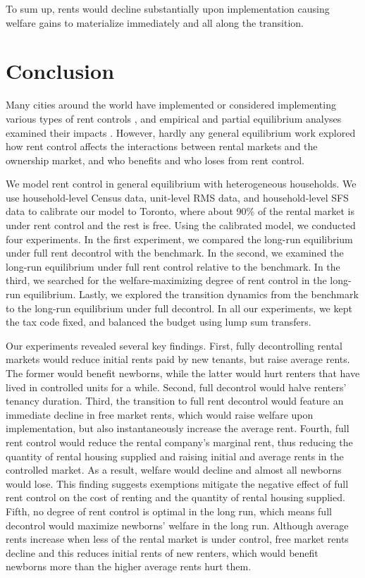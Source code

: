 \documentclass[parskip=full]{article}
\begin{document}
To sum up, rents would decline substantially upon implementation causing welfare gains to materialize immediately and all along the transition. 

\section{Conclusion}\label{sec:conclusion}

Many cities around the world have implemented or considered implementing various types of rent controls \citep{fraser-1981}, and empirical and partial equilibrium analyses examined their impacts \citep{hayek-1929,fs-1946,fallis-1985,diamond-2019}. However, hardly any general equilibrium work explored how rent control affects the interactions between rental markets and the ownership market, and who benefits and who loses from rent control. 

We model rent control in general equilibrium with heterogeneous households. We use household-level Census data, unit-level RMS data, and household-level SFS data to calibrate our model to Toronto, where about 90\% of the rental market is under rent control and the rest is free. Using the calibrated model, we conducted four experiments. In the first experiment, we compared the long-run equilibrium under full rent decontrol with the benchmark. In the second, we examined the long-run equilibrium under full rent control relative to the benchmark. In the third, we searched for the welfare-maximizing degree of rent control in the long-run equilibrium. Lastly, we explored the transition dynamics from the benchmark to the long-run equilibrium under full decontrol. In all our experiments, we kept the tax code fixed, and balanced the budget using lump sum transfers.

Our experiments revealed several key findings. First, fully decontrolling rental markets would reduce initial rents paid by new tenants, but raise average rents. The former would benefit newborns, while the latter would hurt renters that have lived in controlled units for a while. Second, full decontrol would halve renters' tenancy duration. Third, the transition to full rent decontrol would feature an immediate decline in free market rents, which would raise welfare upon implementation, but also instantaneously increase the average rent. Fourth, full rent control would reduce the rental company's marginal rent, thus reducing the quantity of rental housing supplied and raising initial and average rents in the controlled market. As a result, welfare would decline and almost all newborns would lose. This finding suggests exemptions mitigate the negative effect of full rent control on the cost of renting and the quantity of rental housing supplied. Fifth, no degree of rent control is optimal in the long run, which means full decontrol would maximize newborns' welfare in the long run. Although average rents increase when less of the rental market is under control, free market rents decline and this reduces initial rents of new renters, which would benefit newborns more than the higher average rents hurt them.
\end{document}
